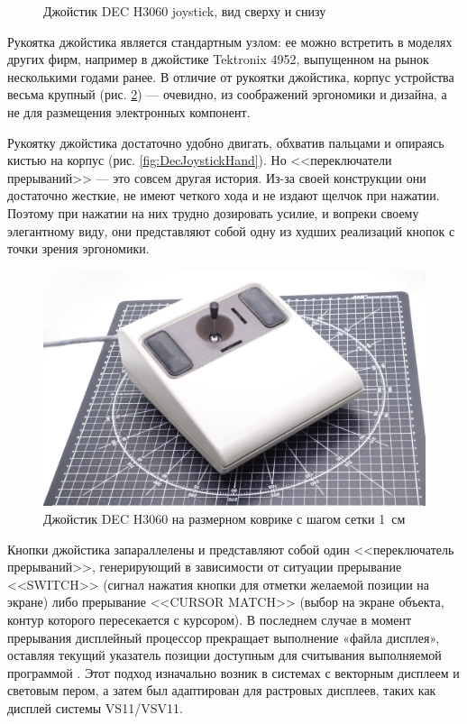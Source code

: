 \documentclass[11pt, a4paper]{article}
\begin{document}
\begin{figure}[h]
    \caption{Джойстик DEC H3060 joystick, вид сверху и снизу}
    \label{fig:DecJoystickTopAndBottom}
\end{figure}

Рукоятка джойстика является стандартным узлом: ее можно встретить в моделях других фирм, например в джойстике Tektronix 4952, выпущенном на рынок несколькими годами ранее. В отличие от рукоятки джойстика,  корпус устройства весьма крупный (рис. \ref{fig:DecJoystickSize}) --- очевидно, из соображений эргономики и дизайна, а не для размещения электронных компонент.

Рукоятку джойстика достаточно удобно двигать, обхватив пальцами и опираясь кистью на корпус (рис. \ref{fig:DecJoystickHand}). Но <<переключатели прерываний>> --- это совсем другая история. Из-за своей конструкции они достаточно жесткие, не имеют четкого хода и не издают щелчок при нажатии. Поэтому при нажатии на них трудно дозировать усилие, и вопреки своему элегантному виду, они представляют собой одну из худших реализаций кнопок с точки зрения эргономики.

\begin{figure}[h]
    \centering
    \includegraphics[scale=0.35]{1978_dec_h3060_joystick/size_30.jpg}
    \caption{Джойстик DEC H3060 на размерном коврике с шагом сетки 1~см}
    \label{fig:DecJoystickSize}
\end{figure}

Кнопки джойстика запараллелены и представляют собой один <<переключатель прерываний>>, генерирующий в зависимости от ситуации прерывание <<SWITCH>> (сигнал нажатия кнопки для отметки желаемой позиции на экране) либо прерывание <<CURSOR MATCH>> (выбор на экране объекта, контур которого пересекается с курсором). В последнем случае в момент прерывания дисплейный процессор прекращает выполнение «файла дисплея», оставляя текущий указатель позиции доступным для считывания выполняемой программой \cite{vsv11}. Этот подход изначально возник в системах с векторным дисплеем и световым пером, а затем был адаптирован для растровых дисплеев, таких как дисплей системы VS11/VSV11.
\end{document}

